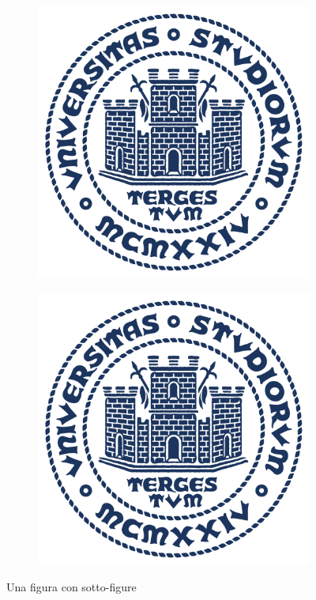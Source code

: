 \begin{figure}[h]
\begin{subfigure}[t]{0.5\textwidth}
        \end{subfigure}
        \begin{subfigure}[t]{0.5\textwidth}
            \includegraphics[width=0.9\linewidth]{img/units_sigillo_pantone-534}
        \end{subfigure}
        \begin{subfigure}[t]{0.5\textwidth}
            \includegraphics[width=0.9\linewidth]{img/units_sigillo_pantone-534}
        \end{subfigure}
        \caption{Una figura con sotto-figure}
        \label{fig:subexample}
    \end{figure}

